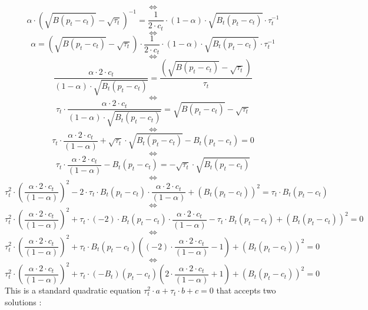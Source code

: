 \documentclass{article}
\begin{document}
$$\iff$$
\begin{equation*}
    \alpha\cdot \left(\sqrt{B(p_{t}-c_{t})}-\sqrt{\tau_{t}}\right)^{-1} = \frac{1}{2\cdot c_{t}}\cdot (1-\alpha)\cdot\sqrt{B_{t}(p_{t}-c_{t})}\cdot\tau_{t}^{-1} 
\end{equation*}
$$\iff$$
\begin{equation*}
    \alpha = \left(\sqrt{B(p_{t}-c_{t})}-\sqrt{\tau_{t}}\right)\cdot \frac{1}{2\cdot c_{t}}\cdot (1-\alpha)\cdot\sqrt{B_{t}(p_{t}-c_{t})}\cdot\tau_{t}^{-1} 
\end{equation*}
$$\iff$$
\begin{equation*}
    \frac{\alpha \cdot 2\cdot c_{t}}{(1-\alpha)\cdot\sqrt{B_{t}(p_{t}-c_{t})}}= \frac{\left(\sqrt{B(p_{t}-c_{t})}-\sqrt{\tau_{t}}\right)}{\tau_{t}} 
\end{equation*}
$$\iff$$
\begin{equation*}
    \tau_{t}\cdot\frac{\alpha \cdot 2\cdot c_{t}}{(1-\alpha)\cdot\sqrt{B_{t}(p_{t}-c_{t})}}= \sqrt{B(p_{t}-c_{t})}-\sqrt{\tau_{t}} 
\end{equation*}
$$\iff$$
\begin{equation*}
    \tau_{t}\cdot\frac{\alpha \cdot 2\cdot c_{t}}{(1-\alpha)}+\sqrt{\tau_{t}}\cdot\sqrt{B_{t}(p_{t}-c_{t})}-B_{t}(p_{t}-c_{t})=0
\end{equation*}
$$\iff$$
\begin{equation*}
    \tau_{t}\cdot\frac{\alpha \cdot 2\cdot c_{t}}{(1-\alpha)}-B_{t}(p_{t}-c_{t})=-\sqrt{\tau_{t}}\cdot\sqrt{B_{t}(p_{t}-c_{t})}
\end{equation*}
$$\iff$$
\begin{equation*}
    \tau_{t}^{2}\cdot\left(\frac{\alpha \cdot 2\cdot c_{t}}{(1-\alpha)}\right)^{2}-2\cdot\tau_{t}\cdot B_{t}\left(p_{t}-c_{t}\right)\cdot \frac{\alpha \cdot 2\cdot c_{t}}{(1-\alpha)}+\left(B_{t}(p_{t}-c_{t})\right)^{2}={\tau_{t}}\cdot{B_{t}(p_{t}-c_{t})}
\end{equation*}
$$\iff$$
\begin{equation*}
    \tau_{t}^{2}\cdot\left(\frac{\alpha \cdot 2\cdot c_{t}}{(1-\alpha)}\right)^{2}+\tau_{t}\cdot(-2)\cdot B_{t}\left(p_{t}-c_{t}\right)\cdot \frac{\alpha \cdot 2\cdot c_{t}}{(1-\alpha)}-{\tau_{t}}\cdot{B_{t}(p_{t}-c_{t})}+\left(B_{t}(p_{t}-c_{t})\right)^{2}=0
\end{equation*}
$$\iff$$
\begin{equation*}
    \tau_{t}^{2}\cdot\left(\frac{\alpha \cdot 2\cdot c_{t}}{(1-\alpha)}\right)^{2}+\tau_{t}\cdot B_{t}\left(p_{t}-c_{t}\right)\left((-2)\cdot \frac{\alpha \cdot 2\cdot c_{t}}{(1-\alpha)}-1\right)+\left(B_{t}(p_{t}-c_{t})\right)^{2}=0
\end{equation*}
$$\iff$$
\begin{equation*}
    \tau_{t}^{2}\cdot\left(\frac{\alpha \cdot 2\cdot c_{t}}{(1-\alpha)}\right)^{2}+\tau_{t}\cdot \left(-B_{t}\right)\left(p_{t}-c_{t}\right)\left(2\cdot \frac{\alpha \cdot 2\cdot c_{t}}{(1-\alpha)}+1\right)+\left(B_{t}(p_{t}-c_{t})\right)^{2}=0
\end{equation*}
This is a standard quadratic equation $\tau_{t}^{2}\cdot a+\tau_{t}\cdot b + c =0$ that accepts two solutions : 
\end{document}
